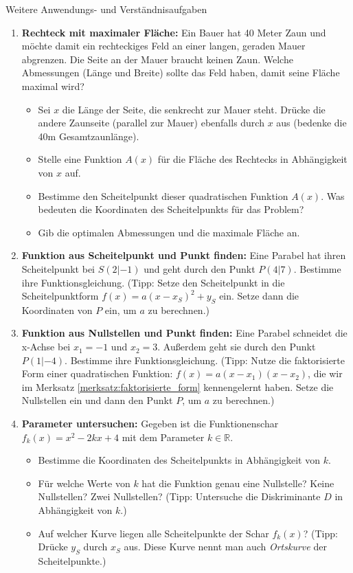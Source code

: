 \begin{aufgabenumgebung}{Weitere Anwendungs- und Verständnisaufgaben}
\begin{enumerate}
    \item \textbf{Rechteck mit maximaler Fläche:} Ein Bauer hat 40 Meter Zaun und möchte damit ein rechteckiges Feld an einer langen, geraden Mauer abgrenzen. Die Seite an der Mauer braucht keinen Zaun. Welche Abmessungen (Länge und Breite) sollte das Feld haben, damit seine Fläche maximal wird?
        \begin{itemize}
            \item Sei $x$ die Länge der Seite, die senkrecht zur Mauer steht. Drücke die andere Zaunseite (parallel zur Mauer) ebenfalls durch $x$ aus (bedenke die 40m Gesamtzaunlänge).
            \item Stelle eine Funktion $A(x)$ für die Fläche des Rechtecks in Abhängigkeit von $x$ auf.
            \item Bestimme den Scheitelpunkt dieser quadratischen Funktion $A(x)$. Was bedeuten die Koordinaten des Scheitelpunkts für das Problem?
            \item Gib die optimalen Abmessungen und die maximale Fläche an.
        \end{itemize}
    \item \textbf{Funktion aus Scheitelpunkt und Punkt finden:} Eine Parabel hat ihren Scheitelpunkt bei $S(2|-1)$ und geht durch den Punkt $P(4|7)$. Bestimme ihre Funktionsgleichung. (Tipp: Setze den Scheitelpunkt in die Scheitelpunktform $f(x)=a(x-x_S)^2+y_S$ ein. Setze dann die Koordinaten von $P$ ein, um $a$ zu berechnen.)
    \item \textbf{Funktion aus Nullstellen und Punkt finden:} Eine Parabel schneidet die x-Achse bei $x_1=-1$ und $x_2=3$. Außerdem geht sie durch den Punkt $P(1|-4)$. Bestimme ihre Funktionsgleichung. (Tipp: Nutze die faktorisierte Form einer quadratischen Funktion: $f(x)=a(x-x_1)(x-x_2)$, die wir im Merksatz \ref{merksatz:faktorisierte_form} kennengelernt haben. Setze die Nullstellen ein und dann den Punkt $P$, um $a$ zu berechnen.)
    \item \textbf{Parameter untersuchen:} Gegeben ist die Funktionenschar $f_k(x) = x^2 - 2kx + 4$ mit dem Parameter $k \in \mathbb{R}$.
        \begin{itemize}
            \item Bestimme die Koordinaten des Scheitelpunkts in Abhängigkeit von $k$.
            \item Für welche Werte von $k$ hat die Funktion genau eine Nullstelle? Keine Nullstellen? Zwei Nullstellen? (Tipp: Untersuche die Diskriminante $D$ in Abhängigkeit von $k$.)
            \item Auf welcher Kurve liegen alle Scheitelpunkte der Schar $f_k(x)$? (Tipp: Drücke $y_S$ durch $x_S$ aus. Diese Kurve nennt man auch \textit{Ortskurve} der Scheitelpunkte.)
        \end{itemize}
\end{enumerate}
\end{aufgabenumgebung}

